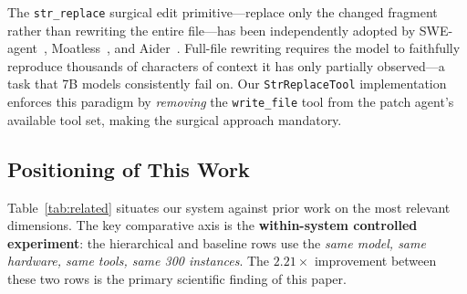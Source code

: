 The \texttt{str\_replace} surgical edit primitive---replace only the changed
fragment rather than rewriting the entire file---has been independently
adopted by SWE-agent~\cite{yang2024sweagent},
Moatless~\cite{orwall2024moatless}, and Aider~\cite{gauthier2024aider}.
Full-file rewriting requires the model to faithfully reproduce thousands of
characters of context it has only partially observed---a task that 7B models
consistently fail on. Our \texttt{StrReplaceTool} implementation enforces
this paradigm by \emph{removing} the \texttt{write\_file} tool from the
patch agent's available tool set, making the surgical approach mandatory.

\subsection{Positioning of This Work}

Table~\ref{tab:related} situates our system against prior work on the most
relevant dimensions. The key comparative axis is the \textbf{within-system
controlled experiment}: the hierarchical and baseline rows use the
\emph{same model, same hardware, same tools, same 300 instances}. The
$2.21\times$ improvement between these two rows is the primary scientific
finding of this paper.

